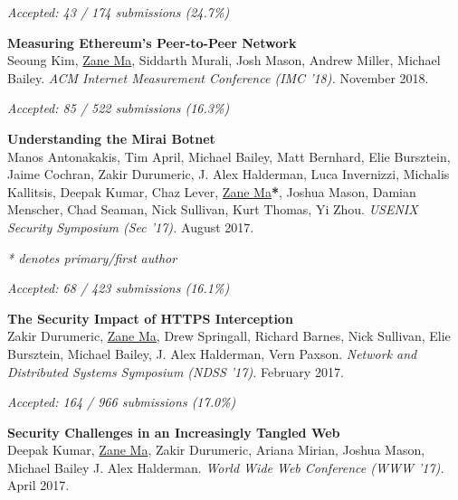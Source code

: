 \documentclass[10pt,singlecolumn]{article} %
\begin{document}
\vspace{6pt}

{\raggedleft\textit{Accepted: 43 / 174 submissions (24.7\%)}\par}

\textbf{Measuring Ethereum's Peer-to-Peer Network}\\
Seoung Kim, \underline{Zane Ma}, Siddarth Murali, Josh Mason, Andrew Miller, Michael Bailey.
\textit{ACM Internet Measurement Conference (IMC '18).} November 2018.


\vspace{6pt}
{\raggedleft\textit{Accepted: 85 / 522 submissions (16.3\%)}\par}

\textbf{Understanding the Mirai Botnet}\\
Manos Antonakakis, Tim April, Michael Bailey, Matt Bernhard, Elie Bursztein, Jaime Cochran, Zakir Durumeric, J. Alex Halderman, Luca Invernizzi, Michalis Kallitsis, Deepak Kumar, Chaz Lever, \underline{Zane Ma}\textbf{*}, Joshua Mason, Damian Menscher, Chad Seaman, Nick Sullivan, Kurt Thomas, Yi Zhou.
\textit{USENIX Security Symposium (Sec '17).} August 2017.

\vspace{12pt}
\textit{* denotes primary/first author}


\vspace{6pt}
{\raggedleft\textit{Accepted: 68 / 423 submissions (16.1\%)}\par}

\textbf{The Security Impact of HTTPS Interception}\\
Zakir Durumeric, \underline{Zane Ma}, Drew Springall, Richard Barnes, Nick Sullivan, Elie Bursztein, Michael
Bailey, J. Alex Halderman, Vern Paxson.
\textit{Network and Distributed Systems Symposium (NDSS '17).} February 2017.


\vspace{6pt}
{\raggedleft\textit{Accepted: 164 / 966 submissions (17.0\%)}\par}

\textbf{Security Challenges in an Increasingly Tangled Web}\\
Deepak Kumar, \underline{Zane Ma}, Zakir Durumeric, Ariana Mirian, Joshua Mason, Michael Bailey J. Alex Halderman.
\textit{World Wide Web Conference (WWW '17).} April 2017.
\end{document}
